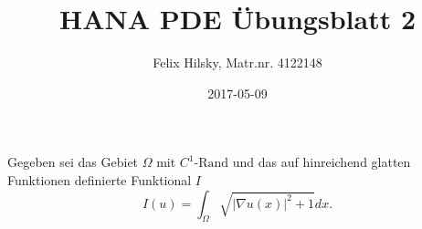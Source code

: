 \documentclass{scrartcl}
\author{Felix Hilsky, Matr.nr. 4122148}
\title{HANA PDE Übungsblatt 2}
\date{2017-05-09}
\newcommand{\abs}[1]{\lvert #1 \rvert}
\begin{document}
  \maketitle


  Gegeben sei das Gebiet
  $\Omega$ mit
  $C^1\text{-Rand}$ und das auf hinreichend glatten Funktionen definierte Funktional $I$
  \begin{equation}
    I(u) = \int_{\Omega}
    \sqrt
    { \abs{ \nabla u (x) } ^ 2 + 1} dx.
  \end{equation}
\end{document}
